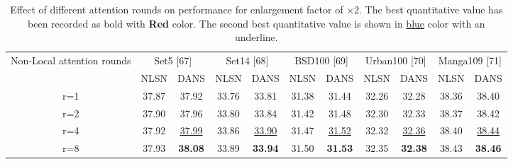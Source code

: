 \documentclass{ieeeaccess}
\begin{document}
\begin{table}
\centering
\caption{Effect of different attention rounds on performance for enlargement factor of $\times$2. The best quantitative value has been recorded as bold with {\color{red}\textbf{Red }} color. The second best quantitative value is shown in {\color{blue}\underline{blue}} color with an underline.}

\label{table4}
\setlength{\tabcolsep}{3 pt}
\begin{tabular}{|c|cc|cc|cc|cc|cc|}
\hline
\multirow{2}{*}{Non-Local attention rounds} & \multicolumn{2}{c|}{Set5 [67]} & \multicolumn{2}{c|}{Set14 [68]} & \multicolumn{2}{c|}{BSD100 [69]} & \multicolumn{2}{c|}{Urban100 [70]} & \multicolumn{2}{c|}{Manga109 [71]}    \\

\cline{2-11}& \multicolumn{1}{c|}{NLSN}  & DANS   & \multicolumn{1}{c|}{NLSN} & DANS    & \multicolumn{1}{c|}{NLSN} & DANS    & \multicolumn{1}{c|}{NLSN}  & DANS  & \multicolumn{1}{c|}{NLSN}  & DANS     \\
\hline


r=1 &\multicolumn {1}{c|}{37.87 } & 37.92  &\multicolumn {1}{c|}{33.76 } & 33.81 &\multicolumn {1}{c|}{31.38 } & 31.44 &\multicolumn {1}{c|}{32.26 } & 32.28 &\multicolumn {1}{c|}{38.36 } & 38.40 \\

r=2 &\multicolumn {1}{c|}{37.90 } & 37.96  &\multicolumn {1}{c|}{33.80 } & 33.84 &\multicolumn {1}{c|}{31.42 } & 31.48 &\multicolumn {1}{c|}{32.30 } & 32.33 &\multicolumn {1}{c|}{38.37 } & 38.42 \\

r=4 &\multicolumn {1}{c|}{37.92} & {\color{blue}\underline{37.99}}  &\multicolumn {1}{c|}{33.86} & {\color{blue}\underline{33.90}} &\multicolumn {1}{c|}{31.47} & {\color{blue}\underline{31.52}} &\multicolumn {1}{c|}{32.32} & {\color{blue}\underline{32.36}} &\multicolumn {1}{c|}{38.40} & {\color{blue}\underline{38.44}} \\

r=8 &\multicolumn {1}{c|}{37.93} & {\color{red}\textbf{38.08}}  &\multicolumn {1}{c|}{33.89} & {\color{red}\textbf{33.94}} &\multicolumn {1}{c|}{31.50} & {\color{red}\textbf{31.53}} &\multicolumn {1}{c|}{32.35} & {\color{red}\textbf{32.38}} &\multicolumn {1}{c|}{38.43} & {\color{red}\textbf{38.46}} \\



\hline



\end{tabular}
\end{table}
\end{document}
